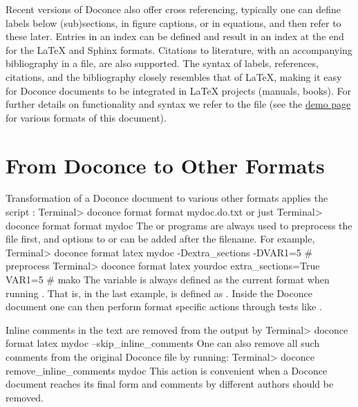 \documentclass{book}
\begin{document}
Recent versions of Doconce also offer cross referencing, typically one
can define labels below (sub)sections, in figure captions, or in
equations, and then refer to these later. Entries in an index can be
defined and result in an index at the end for the {\LaTeX} and Sphinx
formats. Citations to literature, with an accompanying bibliography in
a file, are also supported. The syntax of labels, references,
citations, and the bibliography closely resembles that of {\LaTeX},
making it easy for Doconce documents to be integrated in {\LaTeX}
projects (manuals, books). For further details on functionality and
syntax we refer to the  file (see the
\href{{https://doconce.googlecode.com/hg/doc/demos/manual/index.html}}{demo page}
for various formats of this document).




\section{From Doconce to Other Formats}

\label{doconce2formats}

Transformation of a Doconce document  to various other
formats applies the script :
\bsys
Terminal> doconce format format mydoc.do.txt
\esys
or just
\bsys
Terminal> doconce format format mydoc
\esys
The  or  programs are always used to preprocess the
file first, and options to  or  can be added after the
filename. For example,
\bsys
Terminal> doconce format latex mydoc -Dextra_sections -DVAR1=5     # preprocess
Terminal> doconce format latex yourdoc extra_sections=True VAR1=5  # mako
\esys
The variable  is always defined as the current format when
running . That is, in the last example,  is
defined as . Inside the Doconce document one can then perform
format specific actions through tests like .

Inline comments in the text are removed from the output by
\bsys
Terminal> doconce format latex mydoc --skip_inline_comments
\esys
One can also remove all such comments from the original Doconce
file by running:
\bccq
Terminal> doconce remove_inline_comments mydoc
\eccq
This action is convenient when a Doconce document reaches its final form
and comments by different authors should be removed.
\end{document}
